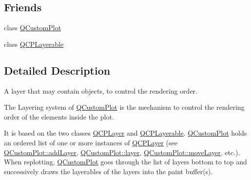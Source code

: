 \subsection*{Friends}
\begin{DoxyCompactItemize}
\item 
class \hyperlink{class_q_c_p_layer_a1cdf9df76adcfae45261690aa0ca2198}{Q\+Custom\+Plot}
\item 
class \hyperlink{class_q_c_p_layer_ad655f55cccf49ba14d5172ec517e07ae}{Q\+C\+P\+Layerable}
\end{DoxyCompactItemize}


\subsection{Detailed Description}
A layer that may contain objects, to control the rendering order. 

The Layering system of \hyperlink{class_q_custom_plot}{Q\+Custom\+Plot} is the mechanism to control the rendering order of the elements inside the plot.

It is based on the two classes \hyperlink{class_q_c_p_layer}{Q\+C\+P\+Layer} and \hyperlink{class_q_c_p_layerable}{Q\+C\+P\+Layerable}. \hyperlink{class_q_custom_plot}{Q\+Custom\+Plot} holds an ordered list of one or more instances of \hyperlink{class_q_c_p_layer}{Q\+C\+P\+Layer} (see \hyperlink{class_q_custom_plot_ad5255393df078448bb6ac83fa5db5f52}{Q\+Custom\+Plot\+::add\+Layer}, \hyperlink{class_q_custom_plot_a0a96244e7773b242ef23c32b7bdfb159}{Q\+Custom\+Plot\+::layer}, \hyperlink{class_q_custom_plot_ae896140beff19424e9e9e02d6e331104}{Q\+Custom\+Plot\+::move\+Layer}, etc.). When replotting, \hyperlink{class_q_custom_plot}{Q\+Custom\+Plot} goes through the list of layers bottom to top and successively draws the layerables of the layers into the paint buffer(s).

